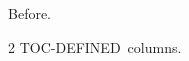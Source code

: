 \documentclass{scrartcl}
\newcommand\mytoc{TOC-DEFINED}%
\begin{document}
Before.
\begin{multicols}{2}
\mytoc\ columns.
\end{multicols}
\end{document}
